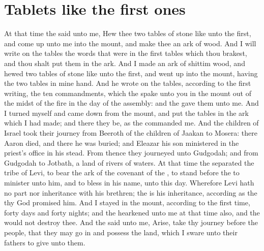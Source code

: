 \section*{Tablets like the first ones}
\begin{biblechapter} %
\verse At that time the \LORD said unto me, Hew thee two tables of stone like unto the first, and come up unto me into the mount, and make thee an ark of wood.
\verse And I will write on the tables the words that were in the first tables which thou brakest, and thou shalt put them in the ark.
\verse And I made an ark of shittim wood, and hewed two tables of stone like unto the first, and went up into the mount, having the two tables in mine hand.
\verse And he wrote on the tables, according to the first writing, the ten commandments, which the \LORD spake unto you in the mount out of the midst of the fire in the day of the assembly: and the \LORD gave them unto me.
\verse And I turned myself and came down from the mount, and put the tables in the ark which I had made; and there they be, as the \LORD commanded me.
\verse And the children of Israel took their journey from Beeroth of the children of Jaakan to Mosera: there Aaron died, and there he was buried; and Eleazar his son ministered in the priest's office in his stead.
\verse From thence they journeyed unto Gudgodah; and from Gudgodah to Jotbath, a land of rivers of waters.
\verse At that time the \LORD separated the tribe of Levi, to bear the ark of the covenant of the \LORD, to stand before the \LORD to minister unto him, and to bless in his name, unto this day.
\verse Wherefore Levi hath no part nor inheritance with his brethren; the \LORD is his inheritance, according as the \LORD thy God promised him.
\verse And I stayed in the mount, according to the first time, forty days and forty nights; and the \LORD hearkened unto me at that time also, and the \LORD would not destroy thee.
\verse And the \LORD said unto me, Arise, take thy journey before the people, that they may go in and possess the land, which I sware unto their fathers to give unto them.

\end{biblechapter}
